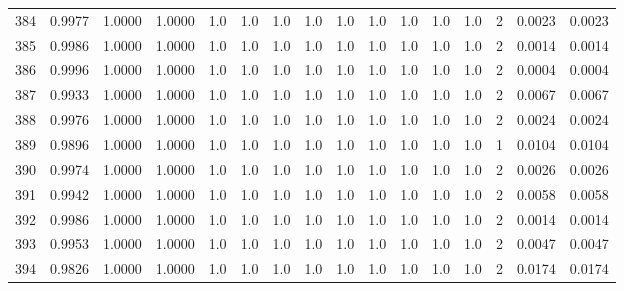 \begin{tabular}{lrrrrrrrrrrrrrrr}
384 &      0.9977 &  1.0000 &  1.0000 &     1.0 &     1.0 &     1.0 &     1.0 &     1.0 &     1.0 &     1.0 &      1.0 &        1.0 &      2 &                    0.0023 &                     0.0023 \\
385 &      0.9986 &  1.0000 &  1.0000 &     1.0 &     1.0 &     1.0 &     1.0 &     1.0 &     1.0 &     1.0 &      1.0 &        1.0 &      2 &                    0.0014 &                     0.0014 \\
386 &      0.9996 &  1.0000 &  1.0000 &     1.0 &     1.0 &     1.0 &     1.0 &     1.0 &     1.0 &     1.0 &      1.0 &        1.0 &      2 &                    0.0004 &                     0.0004 \\
387 &      0.9933 &  1.0000 &  1.0000 &     1.0 &     1.0 &     1.0 &     1.0 &     1.0 &     1.0 &     1.0 &      1.0 &        1.0 &      2 &                    0.0067 &                     0.0067 \\
388 &      0.9976 &  1.0000 &  1.0000 &     1.0 &     1.0 &     1.0 &     1.0 &     1.0 &     1.0 &     1.0 &      1.0 &        1.0 &      2 &                    0.0024 &                     0.0024 \\
389 &      0.9896 &  1.0000 &  1.0000 &     1.0 &     1.0 &     1.0 &     1.0 &     1.0 &     1.0 &     1.0 &      1.0 &        1.0 &      1 &                    0.0104 &                     0.0104 \\
390 &      0.9974 &  1.0000 &  1.0000 &     1.0 &     1.0 &     1.0 &     1.0 &     1.0 &     1.0 &     1.0 &      1.0 &        1.0 &      2 &                    0.0026 &                     0.0026 \\
391 &      0.9942 &  1.0000 &  1.0000 &     1.0 &     1.0 &     1.0 &     1.0 &     1.0 &     1.0 &     1.0 &      1.0 &        1.0 &      2 &                    0.0058 &                     0.0058 \\
392 &      0.9986 &  1.0000 &  1.0000 &     1.0 &     1.0 &     1.0 &     1.0 &     1.0 &     1.0 &     1.0 &      1.0 &        1.0 &      2 &                    0.0014 &                     0.0014 \\
393 &      0.9953 &  1.0000 &  1.0000 &     1.0 &     1.0 &     1.0 &     1.0 &     1.0 &     1.0 &     1.0 &      1.0 &        1.0 &      2 &                    0.0047 &                     0.0047 \\
394 &      0.9826 &  1.0000 &  1.0000 &     1.0 &     1.0 &     1.0 &     1.0 &     1.0 &     1.0 &     1.0 &      1.0 &        1.0 &      2 &                    0.0174 &                     0.0174 \\

\end{tabular}
